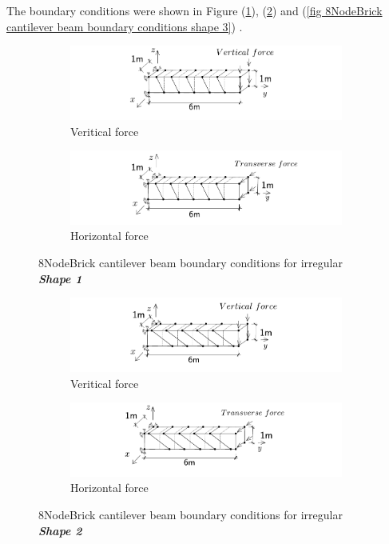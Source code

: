 \documentclass[fleqn,11pt]{article}
\begin{document}
The boundary conditions were shown in Figure (\ref{fig 8NodeBrick cantilever beam boundary conditions shape 1}), (\ref{fig 8NodeBrick cantilever beam boundary conditions shape 2}) and (\ref{fig 8NodeBrick cantilever beam boundary conditions shape 3}) .

\begin{figure}[H]
  \centering
    \begin{subfigure}{0.5\textwidth}
      \centering
      \includegraphics[width=9cm]{../Figure-files/beam_brick_shape1_vertical.pdf}
      \caption{Veritical force}
    \end{subfigure}
    \begin{subfigure}{0.5\textwidth}
      \centering
      \includegraphics[width=9cm]{../Figure-files/beam_brick_shape1_horizontal.pdf}
      \caption{Horizontal force}
    \end{subfigure}
  \caption{8NodeBrick cantilever beam boundary conditions for irregular \textbf{\emph{Shape 1}} }
  \label{fig 8NodeBrick cantilever beam boundary conditions shape 1}
\end{figure}


\begin{figure}[H]
  \centering
    \begin{subfigure}{0.5\textwidth}
      \centering
      \includegraphics[width=9cm]{../Figure-files/beam_brick_shape2_vertical.pdf}
      \caption{Veritical force}
    \end{subfigure}
    \begin{subfigure}{0.5\textwidth}
      \centering
      \includegraphics[width=9cm]{../Figure-files/beam_brick_shape2_horizontal.pdf}
      \caption{Horizontal force}
    \end{subfigure}
  \caption{8NodeBrick cantilever beam boundary conditions for irregular \textbf{\emph{Shape 2}} }
  \label{fig 8NodeBrick cantilever beam boundary conditions shape 2}
\end{figure}
\end{document}

